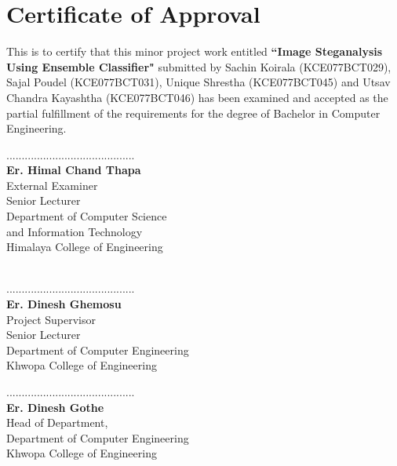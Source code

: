 \titleformat{\chapter}[display]{\normalfont\huge\bfseries\centering}{\chaptertitlename\ \thechapter}{20pt}{\Huge}
\chapter*{ Certificate of Approval}
\thispagestyle{empty}
	\vspace{1cm}
	This is to certify that this minor project work entitled \textbf{``Image Steganalysis Using Ensemble Classifier"} submitted by Sachin Koirala (KCE077BCT029), Sajal Poudel (KCE077BCT031), Unique Shrestha (KCE077BCT045) and Utsav Chandra Kayashtha (KCE077BCT046) has been examined and accepted as the partial fulfillment of the requirements for the degree of Bachelor in Computer Engineering.\\
	\vspace{1in}
	\begin{multicols}{2}
	  \begin{center}
		..........................................\\
		\textbf{Er. Himal Chand Thapa}\\
		External Examiner\\
		Senior Lecturer\\     
		Department of Computer Science\\ and Information Technology\\
		Himalaya College of Engineering\\
		\textbf{}\\
		
	  \end{center}
	
	\columnbreak
	  \begin{center}
		..........................................\\
		\textbf{Er. Dinesh Ghemosu}\\
		Project Supervisor\\
		Senior Lecturer\\
		Department of Computer Engineering\\
		Khwopa College of Engineering\\
		
	  \end{center}
	\end{multicols}
	\vspace{1in}
	\begin{center}
	  ..........................................\\
	  \textbf{Er. Dinesh Gothe}\\
	  Head of Department,\\
	  Department of Computer Engineering\\
	  Khwopa College of Engineering
	\end{center}